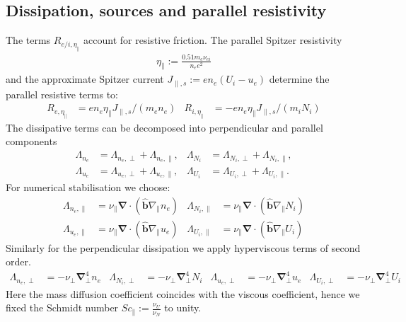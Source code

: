 \documentclass{hitec} %
\renewcommand{\vec}[1]{\boldsymbol{#1}}
\begin{document}
\subsection{Dissipation, sources and parallel resistivity}\label{sec:dissres}
The terms $R_{e/i,\eta_\parallel}$ account for resistive friction.
The parallel Spitzer resistivity
\begin{align}
\eta_\parallel := \frac{0.51 m_e \nu_{ei}}{n_e e^2}
\end{align}
and the approximate Spitzer current \(J_{\parallel,s}:= e n_e \left(U_i - u_e\right)\) determine the parallel resistive terms to:
\begin{align}
  R_{e,\eta_\parallel} &=  en_e\eta_\parallel J_{\parallel,s}/(m_en_e)  &
  R_{i,\eta_\parallel} &=- en_e\eta_\parallel J_{\parallel,s}/(m_iN_i)
\end{align}
The dissipative terms can be decomposed into perpendicular and parallel components
\begin{align}
 \Lambda_{n_e} &= \Lambda_{n_e,\perp}+\Lambda_{n_e,\parallel}, &
 \Lambda_{N_i} &= \Lambda_{N_i,\perp}+\Lambda_{N_i,\parallel},\\
 \Lambda_{u_e} &= \Lambda_{u_e,\perp}+\Lambda_{u_e,\parallel},&
 \Lambda_{U_i} &= \Lambda_{U_i,\perp}+\Lambda_{U_i,\parallel}.
\end{align}
For numerical stabilisation we choose:
\begin{align}
\Lambda_{n_e,\parallel} &=  \nu_\parallel\vec{\nabla} \cdot \left(\vec{\hat{b}} \nabla_\parallel n_e\right) &
 \Lambda_{N_i,\parallel} &=  \nu_\parallel\vec{\nabla} \cdot \left(\vec{\hat{b}} \nabla_\parallel N_i\right) \\
  \Lambda_{u_e,\parallel} &= \nu_\parallel \vec{\nabla} \cdot \left(\vec{\hat{b}} \nabla_\parallel u_e\right) &
 \Lambda_{U_i,\parallel} &= \nu_\parallel \vec{\nabla} \cdot \left(\vec{\hat{b}} \nabla_\parallel U_i\right) 
\end{align}
Similarly for the perpendicular dissipation we apply hyperviscous terms of second order.
\begin{align}\label{eq:perpdiffNT}
 \Lambda_{n_e,\perp} &=  -\nu_\perp \vec{\nabla}_\perp^4 n_e &
 \Lambda_{N_i,\perp} &=  -\nu_\perp \vec{\nabla}_\perp^4 N_i &
 \Lambda_{u_e,\perp} &=  -\nu_\perp \vec{\nabla}_\perp^4 u_e &
 \Lambda_{U_i,\perp} &=  -\nu_\perp \vec{\nabla}_\perp^4 U_i
\end{align}
Here the mass diffusion coefficient coincides with the viscous coefficient, hence we fixed the Schmidt number \(\mathit{Sc}_\parallel:= \frac{\nu_U}{\nu_N}\) to unity.
\end{document}
